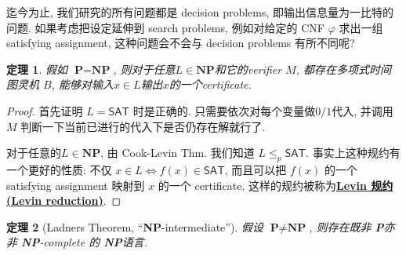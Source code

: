 \documentclass[8pt]{article}
\theoremstyle{compact}
\newtheorem{theorem}{定理}[section]
\def\obj#1{\textbf{\uline{#1}}}
\def\le{\leqslant}
\def\P{\textbf{P}}
\def\NP{\textbf{NP}}
\begin{document}
迄今为止, 我们研究的所有问题都是 decision problems, 即输出信息量为一比特的问题. 如果考虑把设定延伸到 search problems, 例如对给定的 CNF $\varphi$ 求出一组 satisfying assignment, 这种问题会不会与 decision problems 有所不同呢?

\begin{theorem}
	假如 $\P = \NP$, 则对于任意$L \in \NP$和它的verifier $M$, 都存在多项式时间图灵机 $B$, 能够对输入$x \in L$输出$x$的一个certificate.
	\label{decision_vs_search}
\end{theorem}
\begin{proof}
	首先证明 $L = \textsf{SAT}$ 时是正确的. 只需要依次对每个变量做$0/1$代入, 并调用 $M$ 判断一下当前已进行的代入下是否仍存在解就行了.

	对于任意的$L \in \NP$, 由 Cook-Levin Thm. 我们知道 $L \le_p \textsf{SAT}$. 事实上这种规约有一个更好的性质: 不仅 $x \in L \Leftrightarrow f(x) \in \textsf{SAT}$, 而且可以把 $f(x)$ 的一个 satisfying assignment 映射到 $x$ 的一个 certificate. 这样的规约被称为\obj{Levin 规约(Levin reduction)}.
\end{proof}
\begin{theorem}[Ladners Theorem, “\NP-intermediate”]
	假设 $\P \neq \NP$, 则存在既非 \P 亦非 \NP-complete 的 \NP 语言.
\end{theorem}
\end{document}
